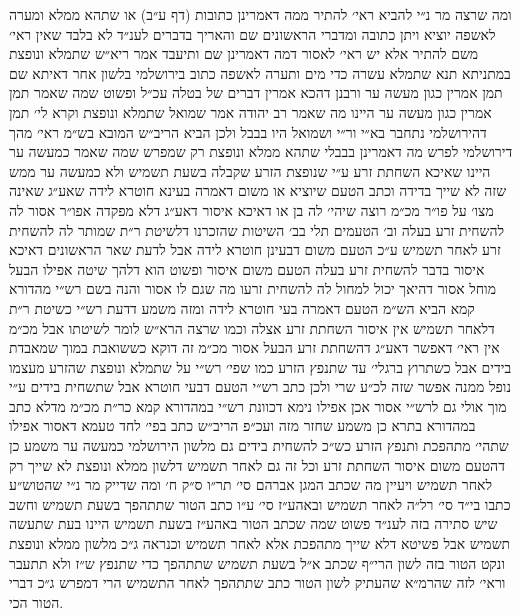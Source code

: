 \documentclass[12pt, openany]{book}
\begin{document}
\begin{multicols}{2}
ומה שרצה מר נ״י להביא ראי׳ להתיר ממה דאמרינן כתובות (דף ע״ב) או שתהא ממלא ומערה לאשפה יוציא ויתן כתובה ומדברי הראשונים שם והאריך בדברים לענ״ד לא בלבד שאין ראי׳ משם להתיר אלא יש ראי׳ לאסור דמה דאמרינן שם ותיעבד אמר ריא״ש שתמלא ונופצת במתניתא תנא שתמלא עשרה כדי מים ותערה לאשפה כתוב בירושלמי בלשון אחר דאיתא שם תמן אמרין כגון מעשה ער ורבנן דהכא אמרין דברים של בטלה עכ״ל ופשוט שמה שאמר תמן אמרין כגון מעשה ער היינו מה שאמר רב יהודה אמר שמואל שתמלא ונופצת וקרא לי׳ תמן דהירושלמי נתחבר בא״י ור״י ושמואל היו בבבל ולכן הביא הריב״ש המובא בש״מ ראי׳ מהך דירושלמי לפרש מה דאמרינן בבבלי שתהא ממלא ונופצת רק שמפרש שמה שאמר כמעשה ער היינו שאיכא השחתת זרע ע״י שנופצת הזרע שקבלה בשעת תשמיש ולא כמעשה ער ממש שזה לא שייך בדידה וכתב הטעם שיוציא או משום דאמרה בעינא חוטרא לידה שאע״ג שאינה מצו׳ על פו״ר מכ״מ רוצה שיהי׳ לה בן או דאיכא איסור דאע״ג דלא מפקדה אפו״ר אסור לה להשחית זרע בעלה וב׳ הטעמים תלי בב׳ השיטות שהזכרנו דלשיטת ר״ת שמותר לה להשחית זרע לאחר תשמיש ע״כ הטעם משום דבעינן חוטרא לידה אבל לדעת שאר הראשונים דאיכא איסור בדבר להשחית זרע בעלה הטעם משום איסור ופשוט הוא דלהך שיטה אפילו הבעל מוחל אסור דהיאך יכול למחול לה להשחית זרעו מה שגם לו אסור והנה בשם רש״י מהדורא קמא הביא הש״מ הטעם דאמרה בעי חוטרא לידה ומזה משמע דדעת רש״י כשיטת ר״ת דלאחר תשמיש אין איסור השחתת זרע אצלה וכמו שרצה הרא״ש לומר לשיטתו אבל מכ״מ אין ראי׳ דאפשר דאע״ג דהשחתת זרע הבעל אסור מכ״מ זה דוקא כששואבת במוך שמאבדת בידים אבל כשתרוץ ברגלי׳ עד שתנפץ הזרע כמו שפי׳ רש״י על שתמלא ונופצת שהזרע מעצמו נופל ממנה אפשר שזה לכ״ע שרי ולכן כתב רש״י הטעם דבעי חוטרא אבל שתשחית בידים ע״י מוך אולי גם לרש״י אסור אכן אפילו נימא דכוונת רש״י במהדורא קמא כר״ת מכ״מ מדלא כתב במהדורא בתרא כן משמע שחזר מזה ועכ״פ הריב״ש כתב בפי׳ לחד טעמא דאסור אפילו שתהי׳ מתהפכת ותנפץ הזרע כש״כ להשחית בידים גם מלשון הירושלמי כמעשה ער משמע כן דהטעם משום איסור השחתת זרע וכל זה גם לאחר תשמיש דלשון ממלא ונופצת לא שייך רק לאחר תשמיש ויעיין מה שכתב המגן אברהם סי׳ תר״ו ס״ק ח׳ ומה שדייק מר נ״י שהטוש״ע כתבו בי״ד סי׳ רל״ה לאחר תשמיש ובאהע״ז סי׳ ע״ו כתב הטור שתתהפך בשעת תשמיש וחשב שיש סתירה בזה לענ״ד פשוט שמה שכתב הטור באהע״ז בשעת תשמיש היינו בעת שתעשה תשמיש אבל פשיטא דלא שייך מתהפכת אלא לאחר תשמיש וכנראה ג״כ מלשון ממלא ונופצת ונקט הטור בזה לשון הרי״ף שכתב א״ל בשעת תשמיש שתתהפך כדי שתנפץ ש״ז ולא תתעבר וראי׳ לזה שהרמ״א שהעתיק לשון הטור כתב שתתהפך לאחר התשמיש הרי דמפרש ג״כ דברי הטור הכי.\\\vspace{0pt}


\end{multicols}
\end{document}
